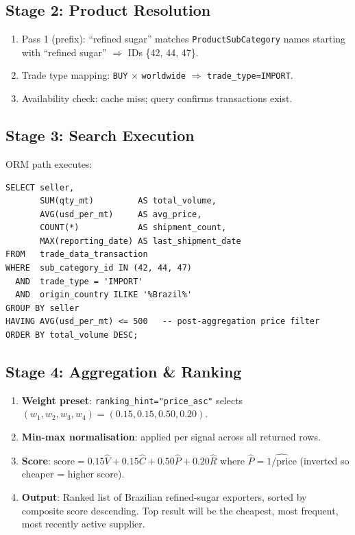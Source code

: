 \documentclass[12pt,a4paper]{article}
\begin{document}
\subsection{Stage 2: Product Resolution}

\begin{enumerate}
  \item Pass 1 (prefix): ``refined sugar'' matches \texttt{ProductSubCategory} names
        starting with ``refined sugar'' $\Rightarrow$ IDs \{42, 44, 47\}.
  \item Trade type mapping: \texttt{BUY} $\times$ \texttt{worldwide}
        $\Rightarrow$ \texttt{trade\_type=IMPORT}.
  \item Availability check: cache miss; query confirms transactions exist.
\end{enumerate}

\subsection{Stage 3: Search Execution}

ORM path executes:

\begin{lstlisting}[caption={Effective SQL (paraphrased)}]
SELECT seller,
       SUM(qty_mt)         AS total_volume,
       AVG(usd_per_mt)     AS avg_price,
       COUNT(*)            AS shipment_count,
       MAX(reporting_date) AS last_shipment_date
FROM   trade_data_transaction
WHERE  sub_category_id IN (42, 44, 47)
  AND  trade_type = 'IMPORT'
  AND  origin_country ILIKE '%Brazil%'
GROUP BY seller
HAVING AVG(usd_per_mt) <= 500   -- post-aggregation price filter
ORDER BY total_volume DESC;
\end{lstlisting}

\subsection{Stage 4: Aggregation \& Ranking}

\begin{enumerate}
  \item \textbf{Weight preset}: \texttt{ranking\_hint="price\_asc"} selects
        $(w_1, w_2, w_3, w_4) = (0.15, 0.15, 0.50, 0.20)$.
  \item \textbf{Min-max normalisation}: applied per signal across all returned rows.
  \item \textbf{Score}: $\text{score} = 0.15\hat{V} + 0.15\hat{C} + 0.50\hat{P} + 0.20\hat{R}$
        where $\hat{P} = \widehat{1/\text{price}}$ (inverted so cheaper = higher score).
  \item \textbf{Output}: Ranked list of Brazilian refined-sugar exporters, sorted
        by composite score descending.  Top result will be the cheapest,
        most frequent, most recently active supplier.
\end{enumerate}
\end{document}
